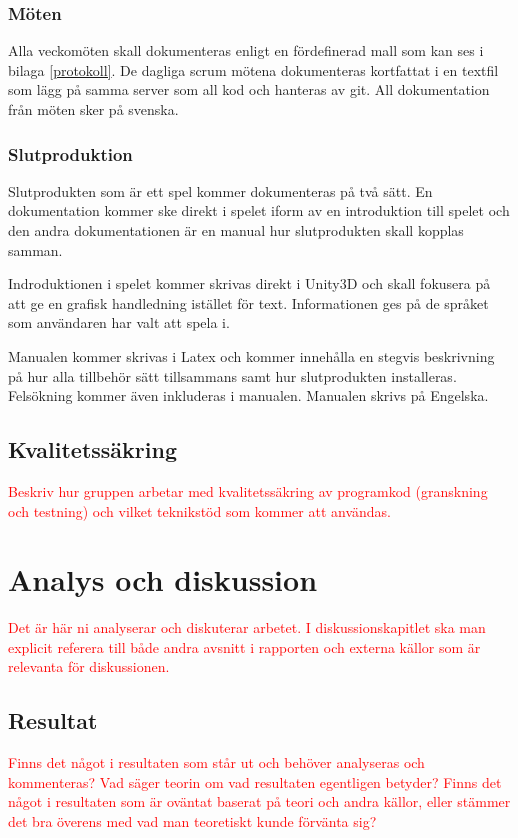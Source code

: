 \documentclass[a4paper,12pt,oneside,final]{extbook}
\begin{document}
\subsection{Möten}
Alla veckomöten skall dokumenteras enligt en fördefinerad mall som kan ses i bilaga \ref{protokoll}. De dagliga scrum mötena dokumenteras kortfattat i en textfil som lägg på samma server som all kod och hanteras av git. All dokumentation från möten sker på svenska.
\subsection{Slutproduktion}
Slutprodukten som är ett spel kommer dokumenteras på två sätt. En dokumentation kommer ske direkt i spelet iform av en introduktion till spelet och den andra dokumentationen är en manual hur slutprodukten skall kopplas samman. 

Indroduktionen i spelet kommer skrivas direkt i Unity3D och skall fokusera på att ge en grafisk handledning istället för text. Informationen ges på de språket som användaren har valt att spela i.

Manualen kommer skrivas i Latex och kommer innehålla en stegvis beskrivning på hur alla tillbehör sätt tillsammans samt hur slutprodukten installeras. Felsökning kommer även inkluderas i manualen. Manualen skrivs på Engelska.

\section{Kvalitetssäkring}

\textcolor{red}{Beskriv hur gruppen arbetar med kvalitetssäkring av programkod (granskning och testning) och vilket
teknikstöd som kommer att användas.
}

\chapter{Analys och diskussion}

\textcolor{red}{Det är här ni analyserar och diskuterar arbetet. I diskussionskapitlet ska man explicit referera till både
andra avsnitt i rapporten och externa källor som är relevanta för diskussionen.
}


\section{Resultat}

\textcolor{red}{Finns det något i resultaten som står ut och behöver analyseras och kommenteras? Vad säger teorin
om vad resultaten egentligen betyder? Finns det något i resultaten som är oväntat baserat på teori och
andra källor, eller stämmer det bra överens med vad man teoretiskt kunde förvänta sig?
}
\end{document}
